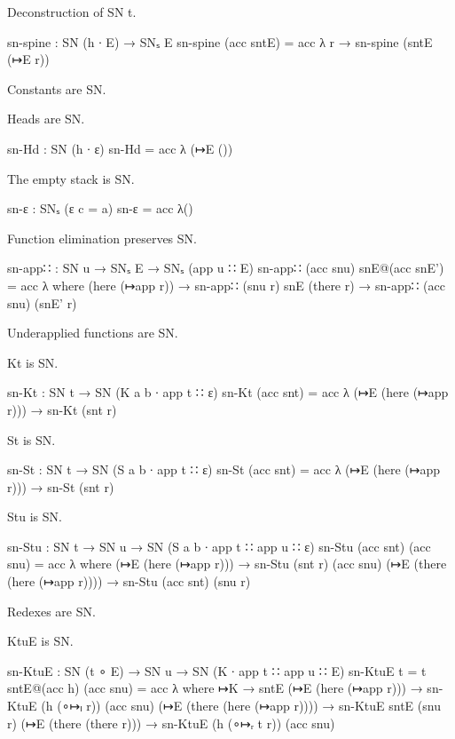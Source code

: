 Deconstruction of SN t.

\begin{code}
sn-spine : SN (h ∙ E) → SNₛ E
sn-spine (acc sntE) = acc λ r → sn-spine (sntE (↦E r))
\end{code}

Constants are SN.

Heads are SN.

\begin{code}
sn-Hd : SN (h ∙ ε)
sn-Hd = acc λ{ (↦E ()) }
\end{code}

The empty stack is SN.

\begin{code}
sn-ε : SNₛ (ε {c = a})
sn-ε = acc λ()
\end{code}

Function elimination preserves SN.

\begin{code}
sn-app∷ : SN u → SNₛ E → SNₛ (app u ∷ E)
sn-app∷ (acc snu) snE@(acc snE') = acc λ where
   (here (↦app r))  → sn-app∷ (snu r)    snE
   (there r)        → sn-app∷ (acc snu)  (snE' r)
\end{code}

Underapplied functions are SN.

Kt is SN.

\begin{code}
sn-Kt : SN t → SN (K {a} {b} ∙ app t ∷ ε)
sn-Kt (acc snt) = acc λ{ (↦E (here (↦app r))) → sn-Kt (snt r) }
\end{code}

St is SN.

\begin{code}
sn-St : SN t → SN (S {a} {b} ∙ app t ∷ ε)
sn-St (acc snt) = acc λ{ (↦E (here (↦app r))) → sn-St (snt r) }
\end{code}

Stu is SN.

\begin{code}
sn-Stu : SN t → SN u → SN (S {a} {b} ∙ app t ∷ app u ∷ ε)
sn-Stu (acc snt) (acc snu) = acc λ where
   (↦E (here (↦app r)))          → sn-Stu (snt r)    (acc snu)
   (↦E (there (here (↦app r))))  → sn-Stu (acc snt)  (snu r)
\end{code}

Redexes are SN.

KtuE is SN.

\begin{code}
sn-KtuE : SN (t ∘ E) → SN u → SN (K ∙ app t ∷ app u ∷ E)
sn-KtuE {t = t} sntE@(acc h) (acc snu)  = acc λ where
   ↦K                            → sntE
   (↦E (here (↦app r)))          → sn-KtuE (h (∘↦ₗ r))    (acc snu)
   (↦E (there (here (↦app r))))  → sn-KtuE sntE           (snu r)
   (↦E (there (there r)))        → sn-KtuE (h (∘↦ᵣ t r))  (acc snu)
\end{code}

